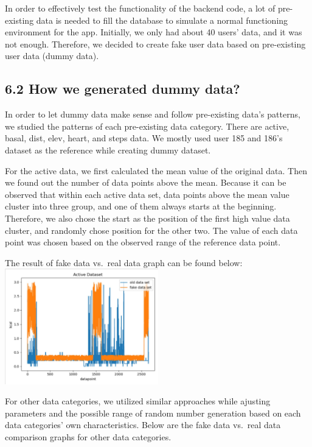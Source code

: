 \documentclass[]{book}
\begin{document}
In order to effectively test the functionality of the backend code, a
lot of pre-existing data is needed to fill the database to simulate a
normal functioning environment for the app. Initially, we only had about
40 users' data, and it was not enough. Therefore, we decided to create
fake user data based on pre-existing user data (dummy data).

\subsection{6.2 How we generated dummy
data?}\label{how-we-generated-dummy-data-1}

In order to let dummy data make sense and follow pre-existing data's
patterns, we studied the patterns of each pre-existing data category.
There are active, basal, dist, elev, heart, and steps data. We mostly
used user 185 and 186's dataset as the reference while creating dummy
dataset.

For the active data, we first calculated the mean value of the original
data. Then we found out the number of data points above the mean.
Because it can be observed that within each active data set, data points
above the mean value cluster into three group, and one of them always
starts at the beginning. Therefore, we also chose the start as the
position of the first high value data cluster, and randomly chose
position for the other two. The value of each data point was chosen
based on the observed range of the reference data point.

The result of fake data vs.~real data graph can be found below:\\
\includegraphics[width=0.50000\textwidth]{./images/Active Data.JPG}

For other data categories, we utilized similar approaches while ajusting
parameters and the possible range of random number generation based on
each data categories' own characteristics. Below are the fake data
vs.~real data comparison graphs for other data categories.
\end{document}
